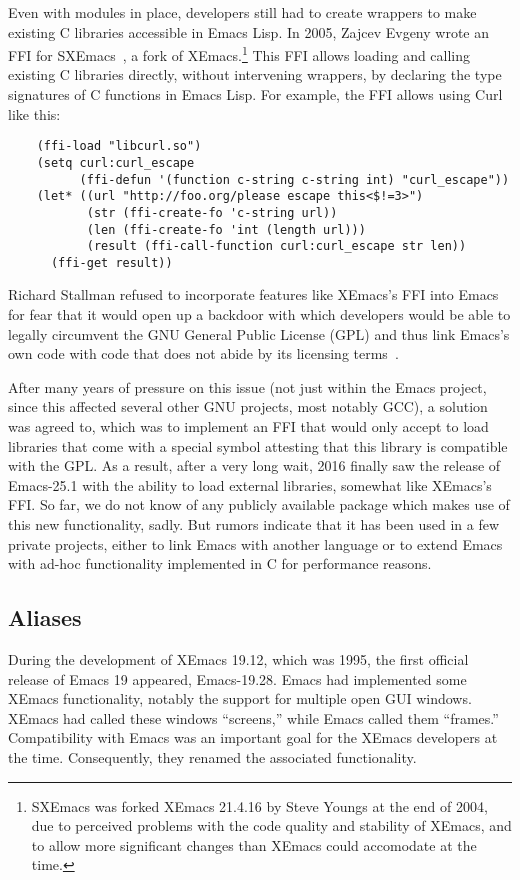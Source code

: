 \documentclass[format=acmsmall, review]{acmart}
\newcommand \Elisp {Emacs Lisp}
\begin{document}
Even with modules in place, developers still had to create wrappers to
make existing C libraries accessible in \Elisp{}.  In 2005, Zajcev
Evgeny wrote an FFI for SXEmacs~\cite{SXEmacs}, a fork of
XEmacs.\footnote{SXEmacs was forked XEmacs 21.4.16 by Steve Youngs at
  the end of 2004, due to perceived problems with the code quality and
stability of XEmacs, and to allow more significant changes than XEmacs
could accomodate at the time.}
This FFI allows loading and calling existing C libraries directly,
without intervening wrappers, by declaring the type signatures of C
functions in \Elisp{}.  For example, the FFI allows using Curl like
this:
\begin{verbatim}
    (ffi-load "libcurl.so")
    (setq curl:curl_escape
          (ffi-defun '(function c-string c-string int) "curl_escape"))
    (let* ((url "http://foo.org/please escape this<$!=3>")
           (str (ffi-create-fo 'c-string url))
           (len (ffi-create-fo 'int (length url)))
           (result (ffi-call-function curl:curl_escape str len))
      (ffi-get result))
\end{verbatim}

Richard Stallman refused to incorporate features like XEmacs's FFI into Emacs for fear
that it would open up a backdoor with which developers would be able to
legally circumvent the GNU General Public License (GPL) and thus link
Emacs's own code with code that does not abide by its licensing terms~\cite{RMS03}.

After many years of pressure on this issue (not just within the Emacs
project, since this affected several other GNU projects, most notably GCC),
a solution was agreed to, which was to implement an FFI that would only
accept to load libraries that come with a special symbol attesting that this
library is compatible with the GPL.  As a result, after a very long wait,
2016 finally saw the release of Emacs-25.1 with the ability to load external
libraries, somewhat like XEmacs's FFI.  So far, we do not know of any publicly
available package which makes use of this new functionality, sadly.
But rumors indicate that it has been used in a few private projects, either
to link Emacs with another language or to extend Emacs with ad-hoc
functionality implemented in C for performance reasons.

\subsection{Aliases}

During the development of XEmacs 19.12, which was 1995, the first
official release of Emacs 19 appeared, Emacs-19.28.  Emacs had
implemented some XEmacs functionality, notably the support for
multiple open GUI windows.  XEmacs had called these windows
``screens,'' while Emacs called them ``frames.''  Compatibility with
Emacs was an important goal for the XEmacs developers at the time.
Consequently, they renamed the associated functionality.
\end{document}
